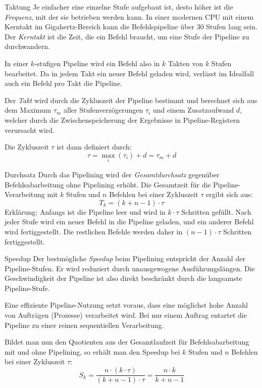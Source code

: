 \begin{defi}[Pipelining]{Taktung}
    Je einfacher eine einzelne Stufe aufgebaut ist, desto höher ist die \emph{Frequenz}, mit der sie betrieben werden kann.
    In einer modernen CPU mit einem Kerntakt im Gigahertz-Bereich kann die Befehlspipeline über 30 Stufen lang sein.
    Der \emph{Kerntakt} ist die Zeit, die ein Befehl braucht, um eine Stufe der Pipeline zu durchwandern.
    
    In einer $k$-stufigen Pipeline wird ein Befehl also in $k$ Takten von $k$ Stufen bearbeitet.
    Da in jedem Takt ein neuer Befehl geladen wird, verlässt im Idealfall auch ein Befehl pro Takt die Pipeline.
    
    Der \emph{Takt} wird durch die Zykluszeit der Pipeline bestimmt und berechnet sich aus dem Maximum $\tau_{m}$ aller Stufenverzögerungen $\tau_{i}$ und einem Zusatzaufwand $d$, welcher durch die Zwischenspeicherung der Ergebnisse in Pipeline-Registern verursacht wird.
    
    Die Zykluszeit $\tau$ ist dann definiert durch:
    \[
        \tau = \max_i (\tau_i) + d = \tau_m + d
    \]
\end{defi}

\begin{defi}[Pipelining]{Durchsatz}
    Durch das Pipelining wird der \emph{Gesamtdurchsatz} gegenüber Befehlsabarbeitung ohne Pipelining erhöht.
    Die Gesamtzeit für die Pipeline-Verarbeitung mit $k$ Stufen und $n$ Befehlen bei einer Zykluszeit $\tau$ ergibt sich aus:
    \[
        T_k = (k + n - 1) \cdot \tau
    \]
    Erklärung: Anfangs ist die Pipeline leer und wird in $k \cdot \tau$ Schritten gefüllt.
    Nach jeder Stufe wird ein neuer Befehl in die Pipeline geladen, und ein anderer Befehl wird fertiggestellt.
    Die restlichen Befehle werden daher in $(n-1)\cdot \tau$ Schritten fertiggestellt.
\end{defi}

\begin{defi}[Pipelining]{Speedup}
    Der bestmögliche \emph{Speedup} beim Pipelining entspricht der Anzahl der Pipeline-Stufen.
    Er wird reduziert durch unausgewogene Ausführungslängen.
    Die Geschwindigkeit der Pipeline ist also direkt beschränkt durch die langsamste Pipeline-Stufe.
    
    Eine effiziente Pipeline-Nutzung setzt voraus, dass eine möglichst hohe Anzahl von Aufträgen (Prozesse) verarbeitet wird.
    Bei nur einem Auftrag entartet die Pipeline zu einer reinen sequentiellen Verarbeitung.
    
    Bildet man nun den Quotienten aus der Gesamtlaufzeit für Befehlsabarbeitung mit und ohne Pipelining, so erhält man den Speedup bei $k$ Stufen und $n$ Befehlen bei einer Zykluszeit $\tau$:
    \[
        S_k = \frac{n \cdot (k \cdot \tau)}{(k + n - 1) \cdot \tau} = \frac{n \cdot k}{k + n - 1}
    \]
\end{defi}

